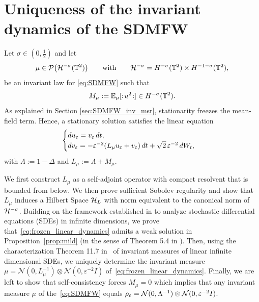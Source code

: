 
\section{Uniqueness of the invariant dynamics of the SDMFW}\label{Chpt_Invariant_Dynamics}

Let $\sigma\in(0,\frac12)$ and let
\[
    \mu\in\mathcal P\bigl(\mathcal H^{-\sigma}(\mathbb{T}^2)\bigr)
    \qquad \text{with} \qquad
    \mathcal H^{-\sigma}
    =H^{-\sigma}(\mathbb{T}^2)\times H^{-1-\sigma}(\mathbb{T}^2),
\]
be an invariant law for \eqref{eq:SDMFW} such that
\[
    M_\mu:=\mathbb E_\mu[:\! u^2 \!:]
    \in H^{-\sigma}(\mathbb{T}^2).
\]
As explained in Section \ref{sec:SDMFW_inv_msr}, stationarity freezes
the mean-field term.  Hence, a stationary solution satisfies the linear
equation
\begin{equation}\label{eq:frozen_linear_dynamics}
    \begin{cases}
        du_\varepsilon=v_\varepsilon\,dt,\\
        dv_\varepsilon=-\varepsilon^{-2}(L_\mu u_\varepsilon+v_\varepsilon)\,dt
        +\sqrt2\,\varepsilon^{-2}\,dW_t,
    \end{cases}
\end{equation}
with $\Lambda:=1-\Delta$ and $L_\mu:=\Lambda+M_\mu$. 

\noindent
We first construct $L_\mu$ as a self-adjoint operator with compact
resolvent that is bounded from below. We then prove sufficient Sobolev regularity and show that $L_\mu$ induces a Hilbert Space $\mathcal{H}_L$ with norm equivalent to the canonical norm of $\mathcal{H}^{-\sigma}$. Building on the framework established in \cite{DaPrato_Zabczyk_2014} to analyze stochastic differential equations (SDEs) in infinite dimensions, we prove that~\eqref{eq:frozen_linear_dynamics} admits a weak solution in Proposition~\ref{prop:mild} (in the sense of Theorem 5.4 in \cite{DaPrato_Zabczyk_2014}). Then, using the characterization Theorem 11.7 in~\cite{DaPrato_Zabczyk_2014} of invariant measures of linear infinite dimensional SDEs, we uniquely determine the invariant measure $\mu = \mathcal{N}(0, L_\mu^{-1}) \otimes \mathcal{N}(0, \varepsilon^{-2}I)$ of~\eqref{eq:frozen_linear_dynamics}. 
Finally, we are left to show that self-consistency forces $M_\mu = 0$ which implies that any invariant measure $\mu$ of the~\eqref{eq:SDMFW} equals $\rho_\varepsilon = \mathcal{N}(0, \Lambda^{-1}) \otimes \mathcal{N}(0, \varepsilon^{-2}I)$.

